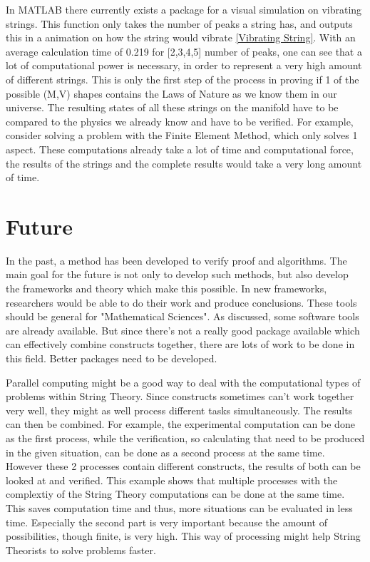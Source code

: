 \documentclass[../paper.tex]{subfiles}
\begin{document}
In MATLAB there currently exists a package for a visual simulation on vibrating strings. This function only takes the number of peaks a string has, and outputs this in a animation on how the string would vibrate \ref{Vibrating String}. With an average calculation time of 0.219 for [2,3,4,5] number of peaks, one can see that a lot of computational power is necessary, in order to represent a very high amount of different strings. This is only the first step of the process in proving if 1 of the possible (M,V) shapes contains the Laws of Nature as we know them in our universe. The resulting states of all these strings on the manifold have to be compared to the physics we already know and have to be verified. For example, consider solving a problem with the Finite Element Method, which only solves 1 aspect. These computations already take a lot of time and computational force, the results of the strings and the complete results would take a very long amount of time.

\section*{Future}
In the past, a method has been developed to verify proof and algorithms. The main goal for the future is not only to develop such methods, but also develop the frameworks and theory which make this possible. In new frameworks, researchers would be able to do their work and produce conclusions. These tools should be general for "Mathematical Sciences". As discussed, some software tools are already available. But since there's not a really good package available which can effectively combine constructs together, there are lots of work to be done in this field. Better packages need to be developed. 

Parallel computing might be a good way to deal with the computational types of problems within String Theory. Since constructs sometimes can't work together very well, they might as well process different tasks simultaneously. The results can then be combined. For example, the experimental computation can be done as the first process, while the verification, so calculating that need to be produced in the given situation, can be done as a second process at the same time. However these 2 processes contain different constructs, the results of both can be looked at and verified. This example shows that multiple processes with the complextiy of the String Theory computations can be done at the same time. This saves computation time and thus, more situations can be evaluated in less time. Especially the second part is very important because the amount of possibilities, though finite, is very high. This way of processing might help String Theorists to solve problems faster.
\end{document}
